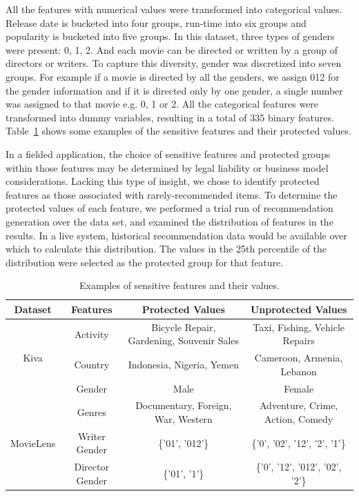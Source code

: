 All the features with numerical values were transformed into categorical values. Release date is bucketed into four groups, run-time into six groups and popularity is bucketed into five groups. In this dataset, three types of genders were present: 0, 1, 2. And each movie can be directed or written by a group of directors or writers. To capture this diversity, gender was discretized into seven groups. For example if a movie is directed by all the genders, we assign 012 for the gender information and if it is directed only by one gender, a single number was assigned to that movie e.g. 0, 1 or 2. All the categorical features were transformed into dummy variables, resulting in a total of 335 binary features. Table~\ref{table:sensitive_features_table} shows some examples of the sensitive features and their protected values.

In a fielded application, the choice of sensitive features and protected groups within those features may be determined by legal liability or business model considerations. Lacking this type of insight, we chose to identify protected features as those associated with rarely-recommended items. To determine the protected values of each feature, we performed a trial run of recommendation generation over the data set, and examined the distribution of features in the results. In a live system, historical recommendation data would be available over which to calculate this distribution. The values in the 25th 
percentile of the distribution were selected as the protected group for that feature.

\begin{table}
    \begin{tabular}{|c|c|c|c|}
    \hline
        Dataset & Features & Protected Values & Unprotected Values \\
    \hline
        \multirow{3}{*}{Kiva} & 
        Activity & Bicycle Repair, Gardening, Souvenir Sales & Taxi, Fishing, Vehicle Repairs \\ 
        & Country & Indonesia, Nigeria, Yemen & Cameroon, Armenia, Lebanon \\
        & Gender & Male & Female \\
        
    \hline
        \multirow{3}{*}{MovieLens} & Genres & Documentary, Foreign, War, Western & Adventure, Crime, Action, Comedy\\
        & Writer Gender & \{'01', '012'\} & \{'0', '02', '12', '2', '1'\} \\
        & Director Gender & \{'01', '1'\} & \{'0', '12', '012', '02', '2'\} \\
    \hline
    \end{tabular}
    \caption{Examples of sensitive features and their values.}
    \label{table:sensitive_features_table}
\end{table}

